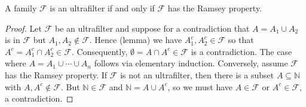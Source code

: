 \begin{lemma}
A family \( \mathcal{F}  \) is an ultrafilter if and only if \( \mathcal{F}  \) has the Ramsey property.
\end{lemma}
\begin{proof}
	Let \( \mathcal{F}  \) be an ultrafilter and suppose for a contradiction that \( A = A_1 \cup A_2 \) is in \( \mathcal{F}\) but \( A_1, A_2 \notin \mathcal{F}  \). Hence (lemma) we have \( A_1^{c} , A_2^{c} \in \mathcal{F}  \) so that \( A^{c} = A_1^{c} \cap A_2^{c} \in \mathcal{F}  \). Consequently, \( \emptyset = A \cap A^{c} \in \mathcal{F}  \) is a contradiction. The case where \( A = A_1 \cup \cdots \cup A_{n}  \) follows via elementary induction. Conversely, assume \( \mathcal{F}  \) has the Ramsey property. If \( \mathcal{F}  \) is not an ultrafilter, then there is a subset \( A \subseteq \mathbb{N}  \) with \( A, A^{c} \notin \mathcal{F}  \). But \( \mathbb{N} \in \mathcal{F}  \) and \( \mathbb{N} = A \cup A^{c}  \), so we must have \( A \in \mathcal{F}  \) or \( A^{c} \in \mathcal{F}  \), a contradiction.
\end{proof}
